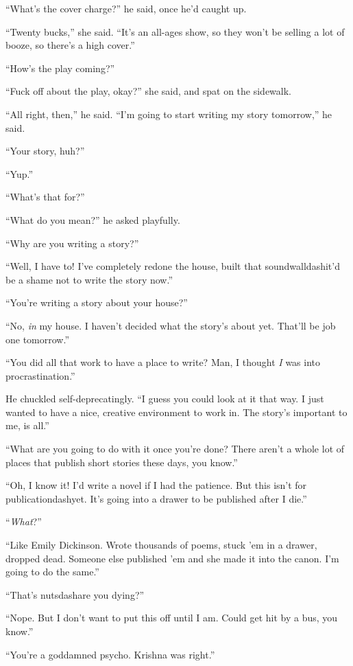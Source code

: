 ``What's the cover charge?'' he said, once he'd caught up.

``Twenty bucks,'' she said.  ``It's an all-ages show, so they won't be
selling a lot of booze, so there's a high cover.''

``How's the play coming?''

``Fuck off about the play, okay?'' she said, and spat on the sidewalk.

``All right, then,'' he said.  ``I'm going to start writing my story
tomorrow,'' he said.

``Your story, huh?''

``Yup.''

``What's that for?''

``What do you mean?'' he asked playfully.

``Why are you writing a story?''

``Well, I have to!  I've completely redone the house, built that
soundwalldash{}it'd be a shame not to write the story now.''

``You're writing a story about your house?''

``No, \textit{in} my house.  I haven't decided what the story's about
yet.  That'll be job one tomorrow.''

``You did all that work to have a place to write?  Man, I thought
\textit{I} was into procrastination.''

He chuckled self-deprecatingly.  ``I guess you could look at it that
way.  I just wanted to have a nice, creative environment to work in. 
The story's important to me, is all.''

``What are you going to do with it once you're done?  There aren't a
whole lot of places that publish short stories these days, you know.''

``Oh, I know it!  I'd write a novel if I had the patience.  But this
isn't for publicationdash{}yet.  It's going into a drawer to be published
after I die.''

``\textit{What}?''

``Like Emily Dickinson.  Wrote thousands of poems, stuck 'em in a
drawer, dropped dead.  Someone else published 'em and she made it into
the canon.  I'm going to do the same.''

``That's nutsdash{}are you dying?''

``Nope.  But I don't want to put this off until I am.  Could get hit
by a bus, you know.''

``You're a goddamned psycho.  Krishna was right.''

